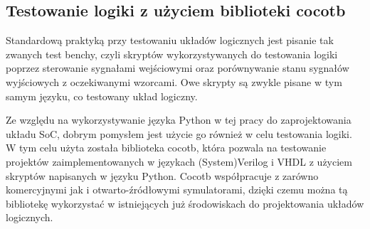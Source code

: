 \subsection{Testowanie logiki z użyciem biblioteki cocotb}
Standardową praktyką przy testowaniu układów logicznych jest pisanie tak zwanych test benchy, czyli skryptów wykorzystywanych do testowania logiki poprzez sterowanie sygnałami wejściowymi oraz porównywanie stanu sygnałów wyjściowych z oczekiwanymi wzorcami. Owe skrypty są zwykle pisane w tym samym języku, co testowany układ logiczny.

Ze względu na wykorzystywanie języka Python w tej pracy do zaprojektowania układu SoC, dobrym pomysłem jest użycie go również w celu testowania logiki. W tym celu użyta została biblioteka cocotb, która pozwala na testowanie projektów zaimplementowanych w językach (System)Verilog i VHDL z użyciem skryptów napisanych w języku Python. Cocotb współpracuje z zarówno komercyjnymi jak i otwarto-źródłowymi symulatorami, dzięki czemu można tą bibliotekę wykorzystać w istniejących już środowiskach do projektowania układów logicznych.

